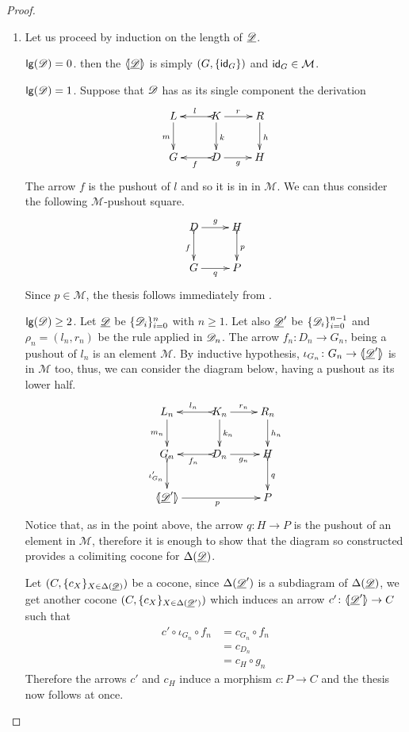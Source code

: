 \begin{proof}\begin{enumerate}
		\item Let us proceed by induction on the length of $\underline{\mathscr{D}}$.

	
	\smallskip \noindent $\mathsf{lg}(\mathscr{D})=0$. then the $\langle \hspace{-1.85pt}[ \underline{\mathscr{\mathscr{D}}}]\hspace{-1.85pt}\rangle$ is simply $(G, \{\mathsf{id}_{G}\})$ and $\mathsf{id}_{G}\in \mathcal{M}$.
	
	\smallskip \noindent$\mathsf{lg}(\mathscr{D})=1$. Suppose that $\mathscr{D}$ has as its single component the derivation
			\[\xymatrix{L \ar[d]_{m}& K \ar[d]^{k}\ar@{>->}[l]_{l} \ar[r]^{r} & R \ar[d]^{h} \\G& \ar@{>->}[l]^{f} D \ar[r]_{g}& H  \\}\]
			The arrow $f$ is  the pushout of $l$ and so it is in in $\mathcal{M}$. We can thus consider the following $\mathcal{M}$-pushout square.
			\[\xymatrix{D \ar@{>->}[d]_{f} \ar[r]^{g} & H \ar@{>->}[d]^{p} \\G \ar[r]_{q}& P }\]
			Since $p\in \mathcal{M}$, the thesis follows immediately from . 
	
	\smallskip \noindent$\mathsf{lg}(\mathscr{D})\geq 2$. Let $\underline{\mathscr{D}}$ be $\{\mathscr{D}_i\}_{i=0}^n$ with $n\geq 1$. Let also $\underline{\mathscr{D}}'$ be $\{\mathscr{D}_i\}^{n-1}_{i=0}$ and $\rho_n=(l_n, r_n)$ be the rule applied in $\mathscr{D}_n$. The arrow $f_n\colon D_n\to G_n$, being a pushout of $l_n$ is an element $\mathcal{M}$. By inductive hypothesis, $\iota_{G_{n}}\colon G_{n}\to \langle \hspace{-1.85pt}[ \underline{\mathscr{D}}']\hspace{-1.85pt}\rangle$ is in $\mathcal{M}$ too, thus, we can consider the diagram below, having a pushout as its lower half.
			\[\xymatrix{L_n \ar[d]_{m_{n}}& K_{n} \ar[d]^{k_{n}}\ar@{>->}[l]_{l_{n}} \ar[r]^{r_{n}} & R_{n} \ar[d]^{h_n} \\G_{n} \ar@{>->}[d]_{\iota'_{G_{n}}}& \ar@{>->}[l]^{f_n} D_n \ar[r]_{g_n}& H  \ar@{>->}[d]^{q}\\ \lpro \der{D}' \ar[rr]_{p}\rpro && P}\] 
			Notice that, as in the point above, the arrow $q\colon H\to P$ is the pushout of an element in $\mathcal{M}$, therefore it is enough to show that the diagram so constructed provides a colimiting cocone for $\Delta(\underline{\mathscr{D}})$.
			
			Let $(C, \{c_X\}_{X\in \Delta(\underline{\mathscr{D}})})$ be a cocone, since $\Delta(\underline{\mathscr{D}}')$ is a subdiagram of $\Delta(\underline{\mathscr{D}})$, we get another cocone $(C, \{c_X\}_{X\in \Delta(\underline{\mathscr{D}}')})$ which induces an arrow $c'\colon \langle \hspace{-1.85pt}[ \underline{\mathscr{D}}' ]\hspace{-1.85pt}\rangle \to C$ such that
			\begin{align*}
				c'\circ \iota_{G_n} \circ f_n &=c_{G_n} \circ f_n\\&= c_{D_n}\\&= c_{H}\circ g_n
			\end{align*}
			Therefore the arrows $c'$ and $c_H$ induce a morphism $c\colon P\to C$ and the thesis now follows at once.
		

\end{enumerate}
\end{proof}
